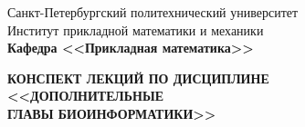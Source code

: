 \documentclass[main.tex]{subfiles}
\begin{document}
\begin{titlepage}
\begin{center}
	\begin{large}
		Санкт-Петербургский политехнический университет\\
		Институт прикладной математики и механики\\
		\textbf{Кафедра <<Прикладная математика>>}\\
	\end{large}
	\vfill
	\Large{\textbf{КОНСПЕКТ ЛЕКЦИЙ ПО ДИСЦИПЛИНЕ \\
			 <<ДОПОЛНИТЕЛЬНЫЕ \\
			 ГЛАВЫ БИОИНФОРМАТИКИ>>}}
\end{center}
\vfill
\begin{figure}[H]
\end{figure}
\vfill
{}
\end{titlepage}
\end{document}
